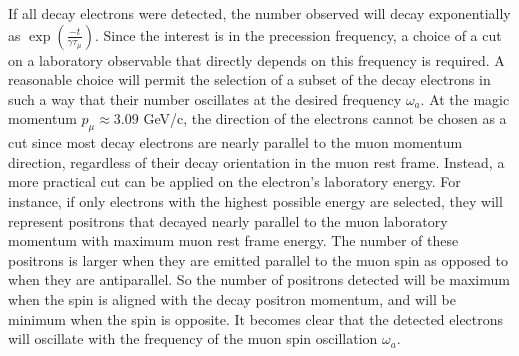 \documentclass{outhesis}
\begin{document}
If all decay electrons were detected, the number observed will decay exponentially as $\exp(\frac{-t}{\gamma \tau_{\mu}})$. Since the interest is in the precession frequency, a choice of a cut on a laboratory observable that directly depends on this frequency is required. A reasonable choice will permit the selection of a subset of the decay electrons in such a way that their number oscillates at the desired frequency $\omega_a$.  At the magic momentum $p_{\mu} \approx 3.09$ GeV/c, the direction of the electrons cannot be chosen as a cut since most decay electrons are nearly parallel to the muon momentum direction, regardless of their decay orientation in the muon rest frame. Instead, a more practical cut can be applied on the electron's laboratory energy. For instance, if only electrons with the highest possible energy are selected, they will represent positrons that decayed nearly parallel to the muon laboratory momentum with maximum muon rest frame energy. The number of these positrons is larger when they are emitted parallel to the muon spin as opposed to when they are antiparallel. So the number of positrons detected will be maximum when the spin is aligned with the decay positron momentum, and will be minimum when the spin is opposite. It becomes clear that the detected electrons will oscillate with the frequency of the muon spin oscillation $\omega_a$.
\end{document}
